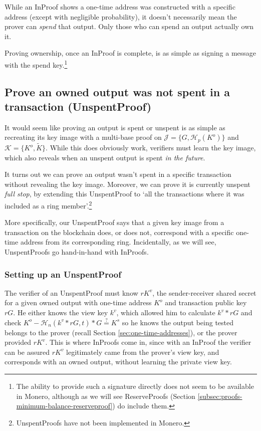 While an InProof shows a one-time address was constructed with a specific address (except with negligible probability), it doesn't necessarily mean the prover can {\em spend} that output. Only those who can spend an output actually own it.

Proving ownership, once an InProof is complete, is as simple as signing a message with the spend key.\footnote{The ability to provide such a signature directly does not seem to be available in Monero, although as we will see ReserveProofs (Section \ref{subsec:proofs-minimum-balance-reserveproof}) do include them.}


\subsection{Prove an owned output was not spent in a transaction (UnspentProof)}
\label{subsec:proofs-owned-output-spent-unspentproof}

It would seem like proving an output is spent or unspent is as simple as recreating its key image with a multi-base proof on $\mathcal{J} = \{G,\mathcal{H}_p(K^o)\}$ and $\mathcal{K} = \{K^o,\tilde{K}\}$. While this does obviously work, verifiers must learn the key image, which also reveals when an unspent output is spent {\em in the future}.

It turns out we can prove an output wasn't spent in a specific transaction without revealing the key image. Moreover, we can prove it is currently unspent {\em full stop}, by extending this UnspentProof \cite{unspent-proof-issue-68} to `all the transactions where it was included as a ring member'.\footnote{UnspentProofs have not been implemented in Monero.}

More specifically, our UnspentProof says that a given key image from a transaction on the blockchain does, or does not, correspond with a specific one-time address from its corresponding ring. Incidentally, as we will see, UnspentProofs go hand-in-hand with InProofs.

\subsubsection*{Setting up an UnspentProof}

The verifier of an UnspentProof must know $r K^v$, the sender-receiver shared secret for a given owned output with one-time address $K^o$ and transaction public key $r G$. He either knows the view key $k^v$, which allowed him to calculate $k^v*r G$ and check $K^o - \mathcal{H}_n(k^v*rG,t)*G \stackrel{?}{=} K^s$ so he knows the output being tested belongs to the prover (recall Section \ref{sec:one-time-addresses}), or the prover provided $r K^v$. This is where InProofs come in, since with an InProof the verifier can be assured $r K^v$ legitimately came from the prover's view key, and corresponds with an owned output, without learning the private view key.


